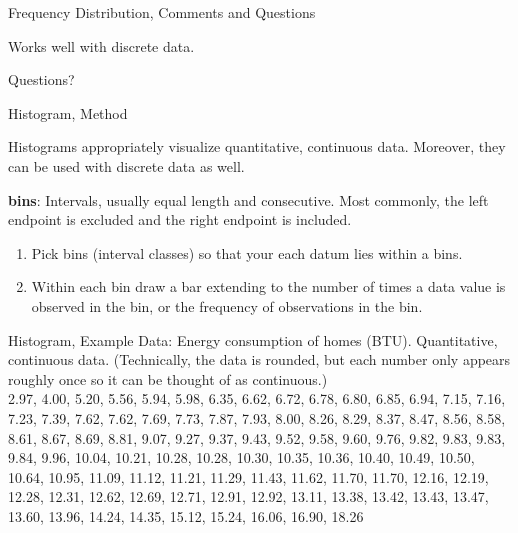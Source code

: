 \documentclass{beamer}
\newcommand{\qtns}[0]{\begin{center} Questions? \end{center}}
\newcommand{\nl}[1]{\vspace{#1 em}}
\begin{document}
\begin{center}
    \begin{frame}{Frequency Distribution, Comments and Questions}
        \begin{center}
            Works well with discrete data.
        \end{center}
        \qtns
    \end{frame}
\end{center}

\begin{frame}{Histogram, Method}
    \begin{center}
        Histograms appropriately visualize quantitative, continuous data. Moreover, they can be used with discrete data as well.
    \end{center}
    {\bf bins}: Intervals, usually equal length and consecutive. Most commonly, the left endpoint is excluded and the right endpoint is included.
    \begin{enumerate}
        \item Pick bins (interval classes) so that your each datum lies within a bins.
        \item Within each bin draw a bar extending to the number of times a data value is observed in the bin, or the frequency of observations in the bin.
    \end{enumerate}
\end{frame}

\begin{frame}{Histogram, Example}
    Data: Energy consumption of homes (BTU). Quantitative, continuous data. (Technically, the data is rounded, but each number only appears roughly once so it can be thought of as continuous.)\\
    \nl{0.5}
    2.97,
    4.00,
    5.20,
    5.56,
    5.94,
    5.98,
    6.35,
    6.62,
    6.72,
    6.78,
    6.80,
    6.85,
    6.94,
    7.15,
    7.16,
    7.23,
    7.39,
    7.62,
    7.62,
    7.69,
    7.73,
    7.87,
    7.93,
    8.00,
    8.26,
    8.29,
    8.37,
    8.47,
    8.56,
    8.58,
    8.61,
    8.67,
    8.69,
    8.81,
    9.07,
    9.27,
    9.37,
    9.43,
    9.52,
    9.58,
    9.60,
    9.76,
    9.82,
    9.83,
    9.83,
    9.84,
    9.96,
    10.04,
    10.21,
    10.28,
    10.28,
    10.30,
    10.35,
    10.36,
    10.40,
    10.49,
    10.50,
    10.64,
    10.95,
    11.09,
    11.12,
    11.21,
    11.29,
    11.43,
    11.62,
    11.70,
    11.70,
    12.16,
    12.19,
    12.28,
    12.31,
    12.62,
    12.69,
    12.71,
    12.91,
    12.92,
    13.11,
    13.38,
    13.42,
    13.43,
    13.47,
    13.60,
    13.96,
    14.24,
    14.35,
    15.12,
    15.24,
    16.06,
    16.90,
    18.26
\end{frame}
\end{document}
